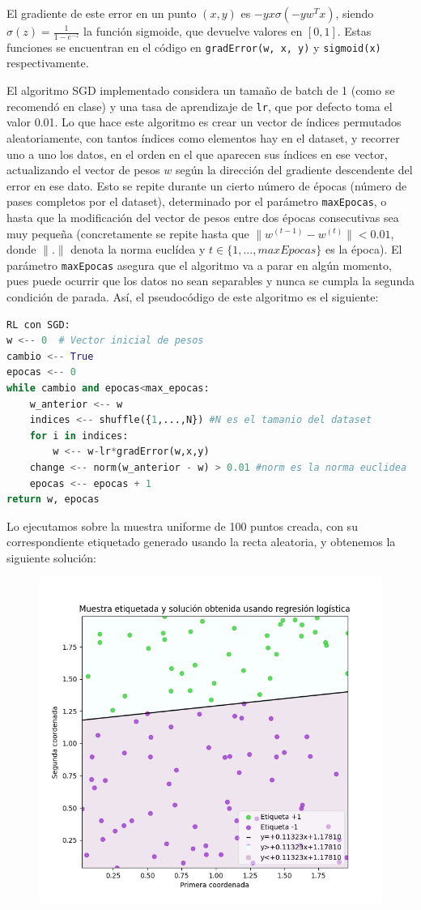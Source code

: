 \documentclass[a4]{article}
\begin{document}
El gradiente de este error en un punto $(x,y)$ es $-yx\sigma(-yw^Tx)$, siendo $\sigma(z)=\frac{1}{1-e^{-z}}$ la función sigmoide, que devuelve valores en $[0,1]$. Estas funciones se encuentran en el código en \lstinline|gradError(w, x, y)| y \lstinline|sigmoid(x)| respectivamente. 

El algoritmo SGD implementado considera un tamaño de batch de 1 (como se recomendó en clase) y una tasa de aprendizaje de \lstinline|lr|, que por defecto toma el valor 0.01. Lo que hace este algoritmo es crear un vector de índices permutados aleatoriamente, con tantos índices como elementos hay en el dataset, y recorrer uno a uno los datos, en el orden en el que aparecen sus índices en ese vector, actualizando el vector de pesos $w$ según la dirección del gradiente descendente del error en ese dato. Esto se repite durante un cierto número de épocas (número de pases completos por el dataset), determinado por el parámetro \lstinline|maxEpocas|, o hasta que la modificación del vector de pesos entre dos épocas consecutivas sea muy pequeña (concretamente se repite hasta que $\|w^{(t-1)}-w^{(t)}\|<0.01$, donde $\|.\|$ denota la norma euclídea y $t\in\{1,...,maxEpocas\}$ es la época). El parámetro \lstinline|maxEpocas| asegura que el algoritmo va a parar en algún momento, pues puede ocurrir que los datos no sean separables y nunca se cumpla la segunda condición de parada. Así, el pseudocódigo de este algoritmo es el siguiente:

\begin{lstlisting}[language=Python]
RL con SGD:
w <-- 0  # Vector inicial de pesos
cambio <-- True
epocas <-- 0
while cambio and epocas<max_epocas:
	w_anterior <-- w
	indices <-- shuffle({1,...,N}) #N es el tamanio del dataset
	for i in indices:
		w <-- w-lr*gradError(w,x,y)
	change <-- norm(w_anterior - w) > 0.01 #norm es la norma euclidea
	epocas <-- epocas + 1
return w, epocas

\end{lstlisting}

Lo ejecutamos sobre la muestra uniforme de 100 puntos creada, con su correspondiente etiquetado generado usando la recta aleatoria, y obtenemos la siguiente solución:

\begin{figure}[H]
	\centering
	\includegraphics[width=0.6\linewidth]{img/RL2}
	\caption{}
	\label{fig:rl2}
\end{figure}
\end{document}
